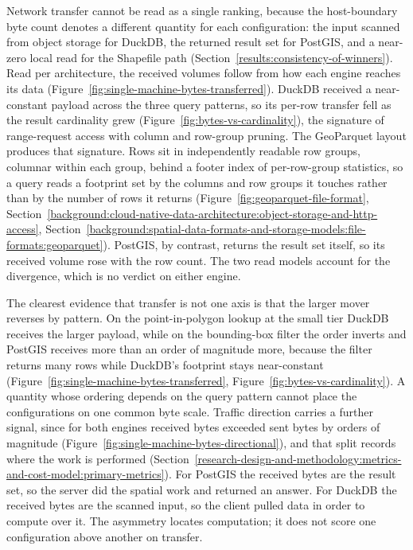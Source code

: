 Network transfer cannot be read as a single ranking, because the host-boundary byte count denotes a different quantity for each configuration: the input scanned from object storage for DuckDB, the returned result set for PostGIS, and a near-zero local read for the Shapefile path (Section~\ref{results:consistency-of-winners}). Read per architecture, the received volumes follow from how each engine reaches its data (Figure~\ref{fig:single-machine-bytes-transferred}). DuckDB received a near-constant payload across the three query patterns, so its per-row transfer fell as the result cardinality grew (Figure~\ref{fig:bytes-vs-cardinality}), the signature of range-request access with column and row-group pruning. The GeoParquet layout produces that signature. Rows sit in independently readable row groups, columnar within each group, behind a footer index of per-row-group statistics, so a query reads a footprint set by the columns and row groups it touches rather than by the number of rows it returns \parencite{ogc2024_geoparquet_specification_v110,lamb2022_querying_parquet_millisecond_latency,maso2023_ogc_cog_standard,fielding2022_rfc9110_http_semantics,duckdb2025_parquet_overview} (Figure~\ref{fig:geoparquet-file-format}, Section~\ref{background:cloud-native-data-architecture:object-storage-and-http-access}, Section~\ref{background:spatial-data-formats-and-storage-models:file-formats:geoparquet}). PostGIS, by contrast, returns the result set itself, so its received volume rose with the row count. The two read models account for the divergence, which is no verdict on either engine.

The clearest evidence that transfer is not one axis is that the larger mover reverses by pattern. On the point-in-polygon lookup at the small tier DuckDB receives the larger payload, while on the bounding-box filter the order inverts and PostGIS receives more than an order of magnitude more, because the filter returns many rows while DuckDB's footprint stays near-constant (Figure~\ref{fig:single-machine-bytes-transferred}, Figure~\ref{fig:bytes-vs-cardinality}). A quantity whose ordering depends on the query pattern cannot place the configurations on one common byte scale. Traffic direction carries a further signal, since for both engines received bytes exceeded sent bytes by orders of magnitude (Figure~\ref{fig:single-machine-bytes-directional}), and that split records where the work is performed (Section~\ref{research-design-and-methodology:metrics-and-cost-model:primary-metrics}). For PostGIS the received bytes are the result set, so the server did the spatial work and returned an answer. For DuckDB the received bytes are the scanned input, so the client pulled data in order to compute over it. The asymmetry locates computation; it does not score one configuration above another on transfer.

